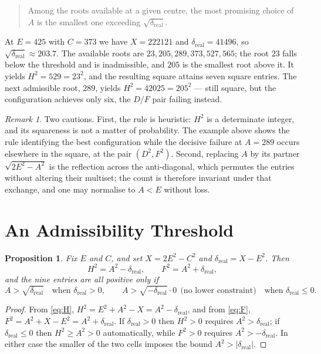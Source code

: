 \documentclass[12pt]{article}
\newtheorem{proposition}[theorem]{Proposition}
\theoremstyle{remark}
\newtheorem{remark}[theorem]{Remark}
\begin{document}
\begin{quote}
Among the roots available at a given centre, the most promising choice
of $A$ is the smallest one exceeding $\sqrt{\delta_{\text{real}}}$.
\end{quote}

At $E = 425$ with $C = 373$ we have $X = 222121$ and
$\delta_{\text{real}} = 41496$, so $\sqrt{\delta_{\text{real}}} \approx 203.7$. The available roots
are $23, 205, 289, 373, 527, 565$; the root $23$ falls below the
threshold and is inadmissible, and $205$ is the smallest root above it.
It yields $H^2 = 529 = 23^2$, and the resulting square attains seven
square entries. The next admissible root, $289$, yields
$H^2 = 42025 = 205^2$ --- still square, but the configuration achieves
only six, the $D/F$ pair failing instead.

\begin{remark}
Two cautions. First, the rule is heuristic: $H^2$ is a determinate
integer, and its squareness is not a matter of probability. The example
above shows the rule identifying the best configuration while the
decisive failure at $A = 289$ occurs elsewhere in the square, at the
pair $(D^2, F^2)$. Second, replacing $A$ by its partner
$\sqrt{2E^2 - A^2}$ is the reflection across the anti-diagonal, which
permutes the entries without altering their multiset; the count is
therefore invariant under that exchange, and one may normalise to
$A < E$ without loss.
\end{remark}

\section{An Admissibility Threshold}

\begin{proposition}\label{prop:threshold}
Fix $E$ and $C$, and set $X = 2E^2 - C^2$ and $\delta_{\text{real}} = X - E^2$. Then
\[
H^2 = A^2 - \delta_{\text{real}}, \qquad F^2 = A^2 + \delta_{\text{real}} ,
\]
and the nine entries are all positive only if
\[
A > \sqrt{\delta_{\text{real}}} \quad\text{when } \delta_{\text{real}} > 0,
\qquad
A > \sqrt{-\delta_{\text{real}}} \cdot 0 \ \ \text{(no lower constraint)}
\quad\text{when } \delta_{\text{real}} \le 0 .
\]
\end{proposition}

\begin{proof}
From \eqref{eq:H}, $H^2 = E^2 + A^2 - X = A^2 - \delta_{\text{real}}$, and from
\eqref{eq:F}, $F^2 = A^2 + X - E^2 = A^2 + \delta_{\text{real}}$. If $\delta_{\text{real}} > 0$
then $H^2 > 0$ requires $A^2 > \delta_{\text{real}}$; if $\delta_{\text{real}} \le 0$ then
$H^2 \ge A^2 > 0$ automatically, while $F^2 > 0$ requires
$A^2 > -\delta_{\text{real}}$. In either case the smaller of the two cells imposes
the bound $A^2 > |\delta_{\text{real}}|$.
\end{proof}
\end{document}
